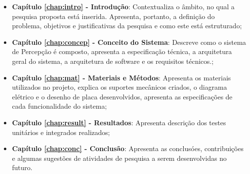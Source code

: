 \begin{itemize}

  \item \textbf{Capítulo \ref{chap:intro} - Introdução}: Contextualiza o âmbito, no qual a pesquisa proposta está inserida. Apresenta, portanto, a definição do problema, objetivos e justificativas da pesquisa e como este \thetypeworkthree está estruturado;

  \item \textbf{Capítulo \ref{chap:concep} - Conceito do Sistema}: Descreve como o sistema de Percepção é composto, apresenta a especificação técnica, a arquitetura geral do sistema, a arquitetura de software e os requisitos técnicos.;
  
  \item \textbf{Capítulo \ref{chap:mat} - Materiais e Métodos}: Apresenta os materiais utilizados no projeto, explica os suportes mecânicos criados, o diagrama elétrico e o desenho de placa desenvolvidos, apresenta as especificações de cada funcionalidade do sistema;
  
  \item \textbf{Capítulo \ref{chap:result} - Resultados}: Apresenta descrição dos testes unitários e integrados realizados;
 
  \item \textbf{Capítulo \ref{chap:conc} - Conclusão}: Apresenta as conclusóes, contribuições
  e algumas sugestões de atividades de pesquisa a serem desenvolvidas no futuro.

\end{itemize}
